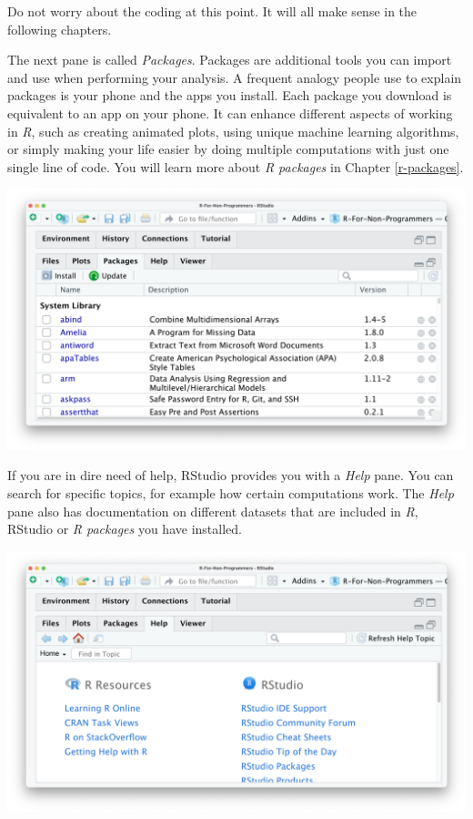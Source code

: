 \documentclass[
]{book}
\begin{document}
Do not worry about the coding at this point. It will all make sense in the following chapters.

The next pane is called \emph{Packages}. Packages are additional tools you can import and use when performing your analysis. A frequent analogy people use to explain packages is your phone and the apps you install. Each package you download is equivalent to an app on your phone. It can enhance different aspects of working in \emph{R}, such as creating animated plots, using unique machine learning algorithms, or simply making your life easier by doing multiple computations with just one single line of code. You will learn more about \emph{R packages} in Chapter \ref{r-packages}.

\includegraphics{images/chapter_04_img/05_files_plots_etc/03_rstudio_packages.png}

If you are in dire need of help, RStudio provides you with a \emph{Help} pane. You can search for specific topics, for example how certain computations work. The \emph{Help} pane also has documentation on different datasets that are included in \emph{R}, RStudio or \emph{R packages} you have installed.

\includegraphics{images/chapter_04_img/05_files_plots_etc/04_rstudio_help.png}
\end{document}
